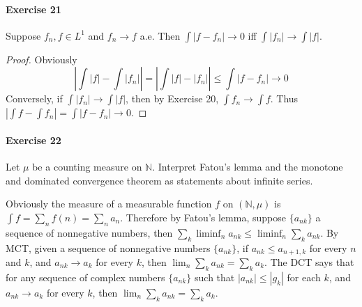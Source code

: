 \paragraph{Exercise 21}
Suppose $f_n,f\in L^1$ and $f_n\to f$ a.e. Then $\int|f-f_n|\to 0$ iff $\int|f_n|\to\int|f|$.
\begin{proof}
    Obviously $$\left|\int|f|-\int|f_n|\right|=\left|\int|f|-|f_n|\right|\le\int|f-f_n|\to 0$$
    Conversely, if $\int|f_n|\to\int|f|$, then by Exercise 20, $\int f_n\to\int f$. Thus $|\int f-\int f_n|=\int|f-f_n|\to 0$.
\end{proof}
\paragraph{Exercise 22}
Let $\mu$ be a counting measure on $\mathbb{N}$. Interpret Fatou's lemma and the monotone and dominated convergence theorem as statements about infinite series.
\begin{solution}
    Obviously the measure of a measurable function $f$ on $(\mathbb{N},\mu)$ is $\int f=\sum_n f(n)=\sum_n a_n$. Therefore by Fatou's lemma, suppose $\{a_{nk}\}$ a sequence of nonnegative numbers, then $\sum_k\liminf_n a_{nk}\le\liminf_n\sum_k a_{nk}$. By MCT, given a sequence of nonnegative numbers $\{a_{nk}\}$, if $a_{nk}\le a_{n+1,k}$ for every $n$ and $k$, and $a_{nk}\to a_{k}$ for every $k$, then $\lim_n\sum_ka_{nk}=\sum_ka_k$. The DCT says that for any sequence of complex numbers $\{a_{nk}\}$ such that $|a_{nk}|\le |g_k|$ for each $k$, and $a_{nk}\to a_k$ for every $k$, then $\lim_n\sum_k a_{nk}=\sum_k a_k$.
\end{solution}